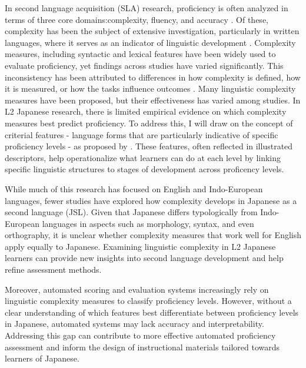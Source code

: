 In second language acquisition (SLA) research, proficiency is often analyzed in terms of three core
domains:complexity, fluency, and accuracy \cite{Skehan1989}. Of these, complexity has been the subject of extensive
investigation, particularly in written languages, where it serves as an indicator of linguistic development
\cite{Lu2010, Lu2011, Ortega2003, Iwashita2006}. Complexity measures, including syntactic and lexical features have
been widely used to evaluate proficiency, yet findings across studies have varied significantly. This inconsistency
has been attributed to differences in how complexity is defined, how it is measured, or how the tasks influence
outcomes \cite{Butle2012}. Many linguistic complexity measures have been proposed, but their effectiveness has
varied among studies. In L2 Japanese research, there is limited empirical evidence on which complexity measures best
predict proficiency.  To address this, I will draw on the concept of criterial features - language forms that are
particularly indicative of specific proficiency levels - as proposed by \cite{Hawkins_Buttery_2010}. These features,
often reflected in illustrated descriptors, help operationalize what learners can do at each level by linking
specific linguistic structures to stages of development across proficency levels.

While much of this research has focused on English and Indo-European languages, fewer studies have explored how
complexity develops in Japanese as a second language (JSL). Given that Japanese differs typologically from
Indo-European languages in aspects such as morphology, syntax, and even orthography, it is unclear whether
complexity measures that work well for English apply equally to Japanese. Examining linguistic complexity in L2
Japanese learners can provide new insights into second language development and help refine assessment methods.

Moreover, automated scoring and evaluation systems increasingly rely on linguistic complexity measures to classify
proficiency levels. However, without a clear understanding of which features best differentiate between
proficiency levels in Japanese, automated systems may lack accuracy and interpretability. Addressing this gap can
contribute to more effective automated proficiency assessment and inform the design of instructional materials
tailored towards learners of Japanese.

